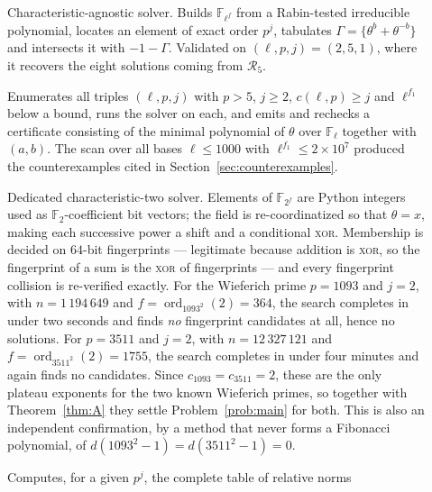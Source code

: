 \documentclass[a4paper]{article}
\newcommand{\F}{\mathbb{F}}
\newcommand{\ord}[2][]{\operatorname{ord}_{#1}\!\left(#2\right)}
\begin{document}
\begin{description}
	\item[]
	      Characteristic-agnostic solver.
	      Builds $\F_{\ell^{f}}$ from a Rabin-tested irreducible
	      polynomial, locates an element of exact order $p^j$, tabulates
	      $\Gamma=\{\theta^{b}+\theta^{-b}\}$ and intersects it with
	      $-1-\Gamma$.
	      Validated on $(\ell,p,j)=(2,5,1)$, where it recovers the eight
	      solutions coming from $\mathcal{R}_5$.
	\item[]
	      Enumerates all triples $(\ell,p,j)$ with $p>5$, $j\geq2$,
	      $c(\ell,p)\geq j$ and $\ell^{f_1}$ below a bound, runs the
	      solver on each, and emits and rechecks a certificate consisting
	      of the minimal polynomial of $\theta$ over $\F_\ell$ together
	      with $(a,b)$.
	      The scan over all bases $\ell\leq1000$ with
	      $\ell^{f_1}\leq2\times10^{7}$ produced the counterexamples cited
	      in Section~\ref{sec:counterexamples}.
	\item[]
	      Dedicated characteristic-two solver.
	      Elements of $\F_{2^{f}}$ are Python integers used as
	      $\F_2$-coefficient bit vectors; the field is re-coordinatized so
	      that $\theta=x$, making each successive power a shift and a
	      conditional \textsc{xor}.
	      Membership is decided on $64$-bit fingerprints --- legitimate
	      because addition is \textsc{xor}, so the fingerprint of a sum is
	      the \textsc{xor} of fingerprints --- and every fingerprint
	      collision is re-verified exactly.
	      For the Wieferich prime $p=1093$ and $j=2$, with
	      $n=1\,194\,649$ and $f=\ord[1093^2]{2}=364$, the search completes
	      in under two seconds and finds \emph{no} fingerprint candidates
	      at all, hence no solutions.
	      For $p=3511$ and $j=2$, with $n=12\,327\,121$ and
	      $f=\ord[3511^2]{2}=1755$, the search completes in under four
	      minutes and again finds no candidates.
	      Since $c_{1093}=c_{3511}=2$, these are the only plateau exponents
	      for the two known Wieferich primes, so together with
	      Theorem~\ref{thm:A} they settle Problem~\ref{prob:main} for both.
	      This is also an independent confirmation, by a method that never
	      forms a Fibonacci polynomial, of
	      $d(1093^2-1)=d(3511^2-1)=0$.
	\item[]
	      Computes, for a given $p^j$, the complete table of relative norms

\end{description}
\end{document}
